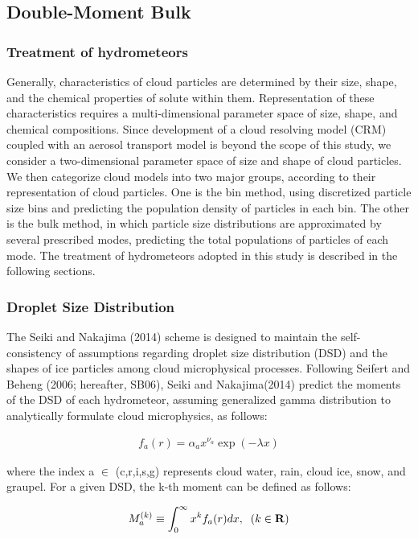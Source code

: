 \subsection{Double-Moment Bulk \cite{sn_2014}}

\subsubsection{Treatment of hydrometeors}
Generally, characteristics of cloud particles are determined by their size, shape, and the chemical properties of solute within them. Representation of these characteristics requires a multi-dimensional parameter space of size, shape, and chemical compositions. Since development of a cloud resolving model (CRM) coupled with an aerosol transport model is beyond the scope of this study, we consider a two-dimensional parameter space of size and shape of cloud particles. We then categorize cloud models into two major groups, according to their representation of cloud particles. One is the bin method, using discretized particle size bins and predicting the population density of particles in each bin. The other is the bulk method, in which particle size distributions are approximated by several prescribed modes, predicting the total populations of particles of each mode. The treatment of hydrometeors adopted in this study is described in the following sections.

\subsubsection{Droplet Size Distribution}
The Seiki and Nakajima (2014)\cite{sn_2014} scheme is designed to maintain the self-consistency of assumptions regarding droplet size distribution (DSD) and the shapes of ice particles among cloud microphysical processes. Following Seifert and Beheng (2006; hereafter, SB06), Seiki and Nakajima(2014)\cite{sn_2014} predict the moments of the DSD of each hydrometeor, assuming generalized gamma distribution to analytically formulate cloud microphysics, as follows:

\begin{eqnarray}
f_{a}(r)=\alpha_{a}x^{\nu_{a}}\exp(-\lambda x)
\label{sn7}
\end{eqnarray}

where the index a $\in$ (c,r,i,s,g) represents cloud water, rain, cloud ice, snow, and graupel. For a given DSD, the k-th moment can be defined as follows:

\begin{eqnarray}
M^{(k)}_{a}\equiv \int_{0}^{\infty}x^{k}f_{a}(r)dx,\;\;(k\in {\bf R})
\label{sn8}
\end{eqnarray}

